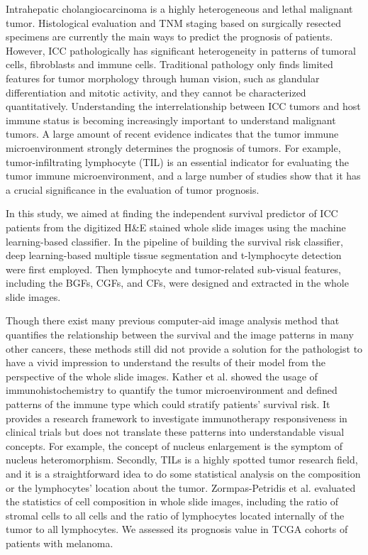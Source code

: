 \documentclass[num-refs]{wiley-article}
\begin{document}
Intrahepatic cholangiocarcinoma is a highly heterogeneous and lethal malignant tumor. Histological evaluation and TNM staging based on surgically resected specimens are currently the main ways to predict the prognosis of patients\cite{bird2018meta}. However, ICC pathologically has significant heterogeneity in patterns of tumoral cells, fibroblasts and immune cells\cite{dong2018spatial}. Traditional pathology only finds limited features for tumor morphology through human vision, such as glandular differentiation and mitotic activity, and they cannot be characterized quantitatively\cite{bera2019artificial,madabhushi2016image}. Understanding the interrelationship between ICC tumors and host immune status is becoming increasingly important to understand malignant tumors. A large amount of recent evidence indicates that the tumor immune microenvironment strongly determines the prognosis of tumors\cite{2019Superpixel}. For example, tumor-infiltrating lymphocyte (TIL) is an essential indicator for evaluating the tumor immune microenvironment, and a large number of studies show that it has a crucial significance in the evaluation of tumor prognosis\cite{pages2018international}.
	
In this study, we aimed at finding the independent survival predictor of ICC patients from the digitized H\&E stained whole slide images using the machine learning-based classifier. In the pipeline of building the survival risk classifier, deep learning-based multiple tissue segmentation and t-lymphocyte detection were first employed. Then lymphocyte and tumor-related sub-visual features, including the BGFs, CGFs, and CFs, were designed and extracted in the whole slide images.

Though there exist many previous computer-aid image analysis method that quantifies the relationship between the survival and the image patterns in many other cancers, these methods still did not provide a solution for the pathologist to have a vivid impression to understand the results of their model from the perspective of the whole slide images. Kather et al. \cite{kather2018topography} showed the usage of immunohistochemistry to quantify the tumor microenvironment and defined patterns of the immune type which could stratify patients' survival risk. It provides a research framework to investigate immunotherapy responsiveness in clinical trials but does not translate these patterns into understandable visual concepts. For example, the concept of nucleus enlargement is the symptom of nucleus heteromorphism. Secondly, TILs is a highly spotted tumor research field, and it is a straightforward idea to do some statistical analysis on the composition or the lymphocytes' location about the tumor. Zormpas-Petridis et al. \cite{zormpas2019superpixel} evaluated the statistics of cell composition in whole slide images, including the ratio of stromal cells to all cells and the ratio of lymphocytes located internally of the tumor to all lymphocytes. We assessed its prognosis value in TCGA cohorts of patients with melanoma.
\end{document}
